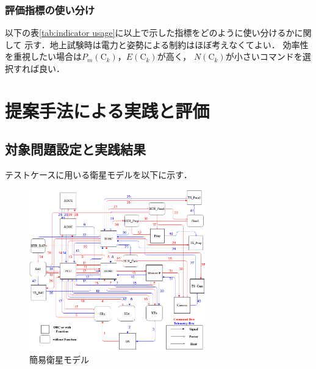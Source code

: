 \documentclass[11pt]{jsarticle}%
\begin{document}
\begin{multicols}{2}
\subsubsection{評価指標の使い分け}
以下の表\ref{tab:indicator usage}に以上で示した指標をどのように使い分けるかに関して
示す．地上試験時は電力と姿勢による制約はほぼ考えなくてよい．
効率性を重視したい場合は$P_m(\text{C}_k)$，$E(\text{C}_k)$が高く，
$N(\text{C}_k)$が小さいコマンドを選択すれば良い．

\begin{table}[H]
  \centering
  \caption{地上試験と運用時での指標の優先度(3段階，降順，\textcolor{red}{赤}：安全重視，黒：効率重視)}
  \label{tab:indicator usage}
\end{table}


  \section{提案手法による実践と評価}
  \subsection{対象問題設定と実践結果}
  テストケースに用いる衛星モデルを以下に示す．
  \begin{figure}[H]
    \centering
      \includegraphics[height=7.0cm]{../figure/satellite_diagram.png}
      \caption{簡易衛星モデル}
      \label{fig:satellite}
  \end{figure}
  

\end{multicols}
\end{document}
